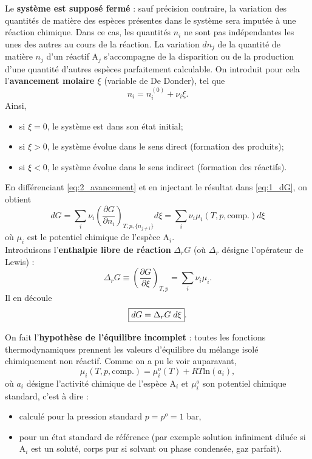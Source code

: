 \documentclass[11pt,a4paper]{report}
\begin{document}
Le \textbf{système est supposé fermé} : sauf précision contraire, la variation des quantités de matière des espèces présentes dans le système sera imputée à une réaction chimique. Dans ce cas, les quantités $n_i$ ne sont pas indépendantes les unes des autres au cours de la réaction. La variation $dn_j$ de la quantité de matière $n_j$ d'un réactif $\text{A}_j$ s'accompagne de la disparition ou de la production d'une quantité d'autres espèces parfaitement calculable. On introduit pour cela l'\textbf{avancement molaire $\xi$} (variable de De Donder), tel que
\begin{equation}
	n_i = n_i^{(0)} + \nu_i \xi.
	\label{eq:2_avancement}
\end{equation}
Ainsi, 
\begin{itemize}
	\item si $\xi = 0$, le système est dans son état initial;
	\item si $\xi > 0$, le système évolue dans le sens direct (formation des produits);
	\item si $\xi < 0$, le système évolue dans le sens indirect (formation des réactifs).
\end{itemize}
En différenciant \eqref{eq:2_avancement} et en injectant le résultat dans \eqref{eq:1_dG}, on obtient
\begin{equation}
	dG = \sum_i \nu_i \left(\frac{\partial G}{\partial n_i}\right)_{T,p,\{n_{j\neq i}\}} d\xi = \sum_i \nu_i \mu_i(T,p,\text{comp.}) d\xi
\end{equation}
où $\mu_i$ est le potentiel chimique de l'espèce $\text{A}_i$.\\

Introduisons l'\textbf{enthalpie libre de réaction} $\Delta_r G$ (où $\Delta_r$ désigne l'opérateur de Lewis) :
\begin{equation}
	\Delta_r G \equiv \left(\frac{\partial G}{\partial \xi}\right)_{T,p} = \sum_i \nu_i \mu_i.
	\label{eq:3_defDeltarG}
\end{equation}
Il en découle
\begin{equation}
	\boxed{dG = \Delta_r G \;d\xi}.\\
	\label{eq:4_evoreac}
\end{equation}

On fait l'\textbf{hypothèse de l'équilibre incomplet} : toutes les fonctions thermodynamiques prennent les valeurs d'équilibre du mélange isolé chimiquement non réactif. Comme on a pu le voir auparavant,
\begin{equation}
	\mu_i (T,p,\text{comp.}) = \mu_i^o(T) + RT\text{ln}(a_i),
\end{equation}
où $a_i$ désigne l'activité chimique de l'espèce $\text{A}_i$ et $\mu_i^o$ son potentiel chimique standard, c'est à dire :
\begin{itemize}
	\item calculé pour la pression standard $p = p^o = 1$ bar,
	\item pour un état standard de référence (par exemple solution infiniment diluée si $\text{A}_i$ est un soluté, corps pur si solvant ou phase condensée, gaz parfait). 
\end{itemize}
\end{document}
